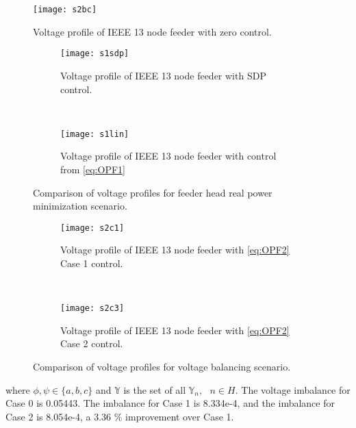 \setlength{\belowcaptionskip}{0pt}
\setlength{\textfloatsep}{5pt}
\begin{figure}[ht!]
	\centering
	\texttt{[image: s2bc]}
	\caption{Voltage profile of IEEE 13 node feeder with zero control.}
	\label{fig:s2bc}
    \begin{subfigure}[b]{0.49\textwidth}
        \centering
        \texttt{[image: s1sdp]}
        \caption{Voltage profile of IEEE 13 node feeder with SDP control.}
        \label{fig:s1sdp}
    \end{subfigure}
    \\
    \begin{subfigure}[b]{0.49\textwidth}
        \centering
        \texttt{[image: s1lin]}
        \caption{Voltage profile of IEEE 13 node feeder with control from \eqref{eq:OPF1}}
        \label{fig:s1lin}
    \end{subfigure}
    \caption{Comparison of voltage profiles for feeder head real power minimization scenario.}
    \label{fig:s1}
    \begin{subfigure}[b]{0.49\textwidth}
        \centering
        \texttt{[image: s2c1]}
        \caption{Voltage profile of IEEE 13 node feeder with \eqref{eq:OPF2} Case 1 control.}
        \label{fig:s2c1}
    \end{subfigure}
    \\
    \begin{subfigure}[b]{0.49\textwidth}
        \centering
        \texttt{[image: s2c3]}
        \caption{Voltage profile of IEEE 13 node feeder with \eqref{eq:OPF2} Case 2 control.}
        \label{fig:s2c3}
    \end{subfigure}
    \caption{Comparison of voltage profiles for voltage balancing scenario.}
    \label{fig:s2}
\end{figure}

\noindent where $\phi,\psi \in  \{ a,b,c\}$ and $\mathbb{Y}$ is the set of all $\mathbb{Y}_{n}, \text{ } n \in H$. The voltage imbalance for Case 0 is 0.05443. The imbalance for Case 1 is 8.334e-4, and the imbalance for Case 2 is 8.054e-4, a 3.36 \% improvement over Case 1.



